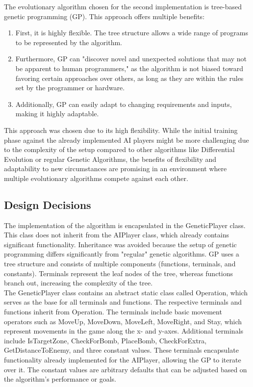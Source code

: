 \documentclass[sigconf]{acmart} %
\begin{document}
The evolutionary algorithm chosen for the second implementation is tree-based genetic programming (GP). This approach offers multiple benefits: 

\begin{enumerate}
	\item First, it is highly flexible. The tree structure allows a wide range of programs to be represented by the algorithm. 
 	\item Furthermore, GP can \cite{TreeBasedGPWeb}"discover novel and unexpected solutions that may not be apparent to human programmers,"  as the algorithm is not biased toward favoring certain approaches over others, as long as they are within the rules set by the programmer or hardware.
  	\item Additionally, GP can easily adapt to changing requirements and inputs, making it highly adaptable.
  \end{enumerate}
This approach was chosen due to its high flexibility. While the initial training phase against the already implemented AI players might be more challenging due to the complexity of the setup compared to other algorithms like Differential Evolution or regular Genetic Algorithms, the benefits of flexibility and adaptability to new circumstances are promising in an environment where multiple evolutionary algorithms compete against each other. 

\subsection{Design Decisions}

The implementation of the algorithm is encapsulated in the GeneticPlayer class. This class does not inherit from the AIPlayer class, which already contains significant functionality. Inheritance was avoided because the setup of genetic programming differs significantly from "regular" genetic algorithms. GP uses a tree structure and consists of multiple components (functions, terminals, and constants). Terminals represent the leaf nodes of the tree, whereas functions branch out, increasing the complexity of the tree. \\ 
The GeneticPlayer class contains an abstract static class called Operation, which serves as the base for all terminals and functions. The respective terminals and functions inherit from Operation. The terminals include basic movement operators such as MoveUp, MoveDown, MoveLeft, MoveRight, and Stay, which represent movements in the game along the x- and y-axes. Additional terminals include IsTargetZone, CheckForBomb, PlaceBomb, CheckForExtra, GetDistanceToEnemy, and three constant values. These terminals encapsulate functionality already implemented for the AIPlayer, allowing the GP to iterate over it. The constant values are arbitrary defaults that can be adjusted based on the algorithm's performance or goals.
\end{document}
